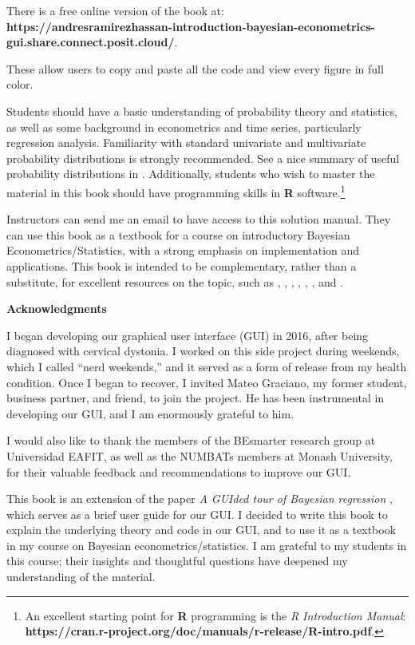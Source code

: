 There is a free online version of the book at:\\
\textbf{https://andresramirezhassan-introduction-bayesian-econometrics-}\\
\textbf{gui.share.connect.posit.cloud/}.

These allow users to copy and paste all the code and view every figure in full color.

Students should have a basic understanding of probability theory and statistics, as well as some background in econometrics and time series, particularly regression analysis. Familiarity with standard univariate and multivariate probability distributions is strongly recommended. See a nice summary of useful probability distributions in \cite[p.~182-191]{greenberg2012introduction}. Additionally, students who wish to master the material in this book should have programming skills in \textbf{R} software.\footnote{An excellent starting point for \textbf{R} programming is the \textit{R Introduction Manual}: \textbf{https://cran.r-project.org/doc/manuals/r-release/R-intro.pdf}.}


Instructors can send me an email to have access to this solution manual. They can use this book as a textbook for a course on introductory Bayesian Econometrics/Statistics, with a strong emphasis on implementation and applications. This book is intended to be complementary, rather than a substitute, for excellent resources on the topic, such as \cite{gelman2021bayesian}, \cite{chan2019bayesian}, \cite{rossi2012bayesian}, \cite{greenberg2012introduction}, \cite{geweke2005contemporary}, \cite{lancaster2004introduction}, and \cite{koop2003bayesian}.


\textbf{Acknowledgments}

I began developing our graphical user interface (GUI) in 2016, after being diagnosed with cervical dystonia. I worked on this side project during weekends, which I called ``nerd weekends,'' and it served as a form of release from my health condition. Once I began to recover, I invited Mateo Graciano, my former student, business partner, and friend, to join the project. He has been instrumental in developing our GUI, and I am enormously grateful to him. 

I would also like to thank the members of the BEsmarter research group at Universidad EAFIT, as well as the NUMBATs members at Monash University, for their valuable feedback and recommendations to improve our GUI.

This book is an extension of the paper \textit{A GUIded tour of Bayesian regression} \cite{Ramirez2020}, which serves as a brief user guide for our GUI. I decided to write this book to explain the underlying theory and code in our GUI, and to use it as a textbook in my course on Bayesian econometrics/statistics. I am grateful to my students in this course; their insights and thoughtful questions have deepened my understanding of the material.

